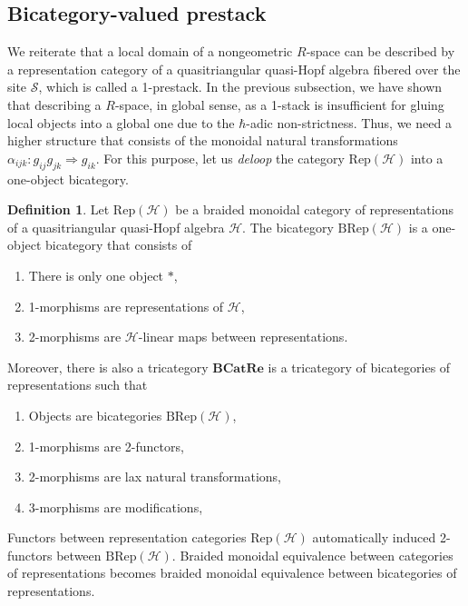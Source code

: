 \documentclass[reqno]{amsart}
\theoremstyle{definition}
\newtheorem{definition}[formula]{Definition}
\theoremstyle{remark}
\begin{document}
\subsection{Bicategory-valued prestack}
We reiterate that a local domain of a nongeometric $R$-space can be described by a representation category of a quasitriangular quasi-Hopf algebra fibered over the site $\mathscr{S}$, which is called a 1-prestack. In the previous subsection, we have shown that describing a $R$-space, in global sense, as a 1-stack is insufficient for gluing local objects into a global one due to the $\hbar$-adic non-strictness. Thus, we need a higher structure that consists of the monoidal natural transformations $\alpha_{ijk}: g_{ij} g_{jk} \Longrightarrow g_{ik}$. For this purpose, let us \textit{deloop} the category $\text{Rep}(\mathscr{H})$ into a one-object bicategory. 
\begin{definition}
    Let $\text{Rep}(\mathscr{H})$ be a braided monoidal category of representations of a quasitriangular quasi-Hopf algebra $\mathscr{H}$. The bicategory $\text{BRep}(\mathscr{H})$ is a one-object bicategory that consists of
    \begin{enumerate}
        \item There is only one object $*$,
        \item 1-morphisms are representations of $\mathscr{H}$,
        \item 2-morphisms are $\mathscr{H}$-linear maps between representations.
    \end{enumerate}
    Moreover, there is also a tricategory $\textbf{BCatRe}$ is a tricategory of bicategories of representations such that
    \begin{enumerate}
        \item Objects are bicategories $\text{BRep}(\mathscr{H})$,
        \item 1-morphisms are 2-functors,
        \item 2-morphisms are lax natural transformations,
        \item 3-morphisms are modifications,
    \end{enumerate}
\end{definition}
Functors between representation categories $\text{Rep}(\mathscr{H})$ automatically induced 2-functors between $\text{BRep}(\mathscr{H})$. Braided monoidal equivalence between categories of representations becomes braided monoidal equivalence between bicategories of representations. 
\end{document}
